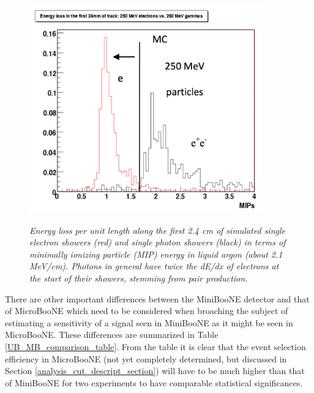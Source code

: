 \begin{figure}[ht!]
\centering
	\includegraphics[width=0.9\textwidth]{Figures/UB_TDR_egamma_dedx.png} \\
\caption{\textit{Energy loss per unit length along the first 2.4 cm of simulated single electron showers (red) and single photon showers (black) in terms of minimally ionizing particle (MIP) energy in liquid argon (about 2.1 MeV/cm). Photons in general have twice the dE/dx of electrons at the start of their showers, stemming from pair production.}}\label{UB_TDR_egammadedx_fig}
\end{figure}

There are other important differences between the MiniBooNE detector and that of MicroBooNE which need to be considered when broaching the subject of estimating a sensitivity of a signal seen in MiniBooNE as it might be seen in MicroBooNE. These differences are summarized in Table \ref{UB_MB_comparison_table}. From the table it is clear that the event selection efficiency in MicroBooNE (not yet completely determined, but discussed in Section \ref{analysis_cut_descript_section}) will have to be much higher than that of MiniBooNE for two experiments to have comparable statistical significances. 

